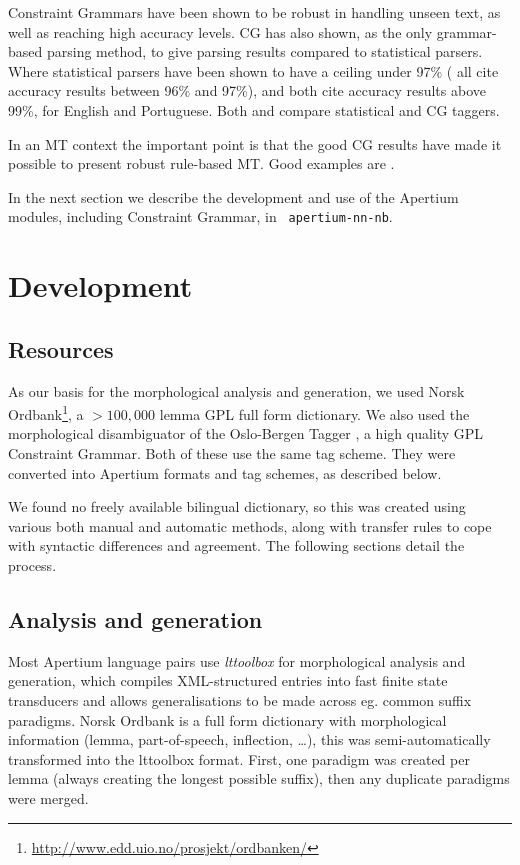 \documentclass[11pt]{article}
\begin{document}
Constraint Grammars have been shown to be robust in handling unseen
text, as well as reaching high accuracy levels. CG has also shown, as
the only grammar-based parsing method, to give parsing results
compared to statistical parsers. Where statistical parsers have been
shown to have a ceiling under 97\% (\citet{leech1994claws,
  brants2000tnt,
  brill1997uld} all cite accuracy results between 96\% and 97\%),
\citet{voutilainen1994engcg} and \citet{bick2000palavras} both cite
accuracy results above 99\%, for English and Portuguese. Both
\citet{chanod1995tfc} and \citet{samuelsson1997cls} compare
statistical and CG taggers.

In an MT context the important point is that the good CG results have 
made it possible to present robust rule-based MT. Good examples are
\citet{bick2007fmw}. %

In the next section we describe the development and use of the
Apertium modules, including Constraint Grammar, in {\tt
  apertium-nn-nb}.

\section{Development}

  \label{sec:development}
\subsection{Resources}

As our basis for the morphological analysis and generation, we used
Norsk
Ordbank\footnote{\href{http://www.edd.uio.no/prosjekt/ordbanken/}{http://www.edd.uio.no/prosjekt/ordbanken/}
}, a $>100,000$ lemma GPL full form dictionary. We also used the
morphological disambiguator of the Oslo-Bergen Tagger
\citep{hagen2000cbt}, a high quality GPL Constraint Grammar. Both of
these use the same tag scheme. They were converted into Apertium
formats and tag schemes, as described below.

We found no freely available bilingual dictionary, so this was created
using various both manual and automatic methods, along with transfer
rules to cope with syntactic differences and agreement. The following
sections detail the process.

\subsection{Analysis and generation}

Most Apertium language pairs use \emph{lttoolbox} for morphological
analysis and generation, which compiles XML-structured entries into
fast finite state transducers and allows generalisations to be made
across eg. common suffix paradigms. Norsk Ordbank is a full form
dictionary with morphological information (lemma, part-of-speech,
inflection, \ldots{}), this was semi-automatically transformed into
the lttoolbox format. First, one paradigm was created per lemma
(always creating the longest possible suffix), then any duplicate
paradigms were merged. 
\end{document}
